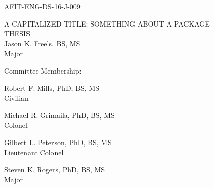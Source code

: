 \documentclass[12pt,letterpaper,oneside]{book}
\begin{document}
	\setcounter{page}{3}
	\noindent AFIT-ENG-DS-16-J-009
	\vfill
	\begin{center}
	    \MakeUppercase{A Capitalized Title: Something about a Package}\\[10pt]
	    \MakeUppercase{Thesis}\\[10pt]
	    
	    \begingroup
  \singlespace
    Jason K. Freels, BS, MS\\ 
    Major
    \par
  \endgroup
  
	\bigskip\medskip
	Committee Membership:
	\bigskip\medskip
	
	\begingroup
  \singlespace
    Robert F. Mills, PhD, BS, MS\\ 
    Civilian
    \par
  \endgroup
  \bigskip\bigskip
  
  \begingroup
  \singlespace
    Michael R. Grimaila, PhD, BS, MS\\ 
    Colonel
    \par
  \endgroup
  \bigskip\bigskip
  
  \begingroup
  \singlespace
    Gilbert L. Peterson, PhD, BS, MS\\ 
    Lieutenant Colonel
    \par
  \endgroup
  \bigskip\bigskip
  
  \begingroup
  \singlespace
    Steven K. Rogers, PhD, BS, MS\\ 
    Major
    \par
  \endgroup
	\end{center}

	\vfill
	\newpage
\end{document}
